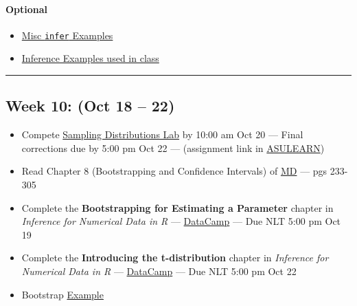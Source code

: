 \documentclass[
]{article}
\begin{document}
\begin{rmdoptional}
\hypertarget{optional}{%
\paragraph*{Optional}\label{optional}}

\begin{itemize}
\item
  \href{../Rmarkdown/ExamplesInfer.html}{Misc \texttt{infer} Examples}
\item
  \href{../Handouts/InferenceExamples.pdf}{Inference Examples used in
  class}
\end{itemize}
\end{rmdoptional}

\begin{center}\rule{0.5\linewidth}{0.5pt}\end{center}

\hypertarget{week-10-oct-18-22}{%
\subsection*{Week 10: (Oct 18 -- 22)}\label{week-10-oct-18-22}}

\begin{itemize}
\item
  Compete
  \href{https://classroom.github.com/classrooms/87543903-stt3850-fall2021}{Sampling
  Distributions Lab} by 10:00 am Oct 20 --- Final corrections due by
  5:00 pm Oct 22 --- (assignment link in
  \href{https://asulearn.appstate.edu/course/view.php?id=131169}{ASULEARN})
\item
  Read Chapter 8 (Bootstrapping and Confidence Intervals) of
  \href{https://moderndive.com}{MD} --- pgs 233-305
\item
  Complete the \textbf{Bootstrapping for Estimating a Parameter} chapter
  in \emph{Inference for Numerical Data in R} ---
  \href{https://app.datacamp.com/groups/stt3850-fall2021/assignments}{DataCamp}
  --- Due NLT 5:00 pm Oct 19
\item
  Complete the \textbf{Introducing the t-distribution} chapter in
  \emph{Inference for Numerical Data in R} ---
  \href{https://app.datacamp.com/groups/stt3850-fall2021/assignments}{DataCamp}
  --- Due NLT 5:00 pm Oct 22
\item
  Bootstrap
  \href{https://stat-ata-asu.github.io/STT3851ClassRepo/Rmarkdown/TheBootstrap.html}{Example}
\end{itemize}
\end{document}
